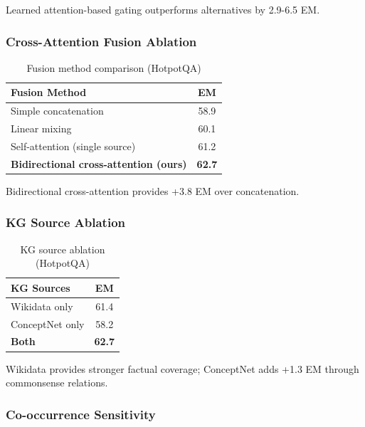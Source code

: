 \documentclass[10pt,twocolumn]{article}
\begin{document}
Learned attention-based gating outperforms alternatives by 2.9-6.5 EM.

\subsubsection{Cross-Attention Fusion Ablation}
\label{sec:fusion_ablation}

\begin{table}[h]
\centering
\caption{Fusion method comparison (HotpotQA)}
\label{tab:fusion_ablation}
\small
\begin{tabular}{@{}lc@{}}
\toprule
\textbf{Fusion Method} & \textbf{EM} \\
\midrule
Simple concatenation & 58.9 \\
Linear mixing & 60.1 \\
Self-attention (single source) & 61.2 \\
\textbf{Bidirectional cross-attention (ours)} & \textbf{62.7} \\
\bottomrule
\end{tabular}
\end{table}

Bidirectional cross-attention provides +3.8 EM over concatenation.

\subsubsection{KG Source Ablation}
\label{sec:kg_source_ablation}

\begin{table}[h]
\centering
\caption{KG source ablation (HotpotQA)}
\label{tab:kg_source}
\small
\begin{tabular}{@{}lc@{}}
\toprule
\textbf{KG Sources} & \textbf{EM} \\
\midrule
Wikidata only & 61.4 \\
ConceptNet only & 58.2 \\
\textbf{Both} & \textbf{62.7} \\
\bottomrule
\end{tabular}
\end{table}

Wikidata provides stronger factual coverage; ConceptNet adds +1.3 EM through commonsense relations.

\subsubsection{Co-occurrence Sensitivity}
\label{sec:cooc_sensitivity}
\end{document}
